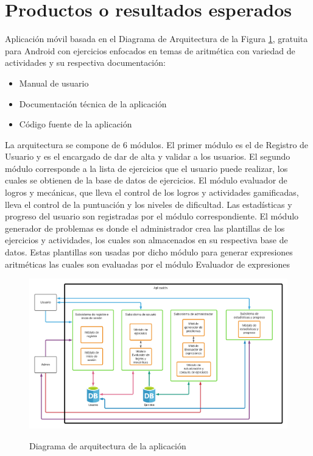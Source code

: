 \documentclass{article}
\begin{document}
\section{Productos o resultados esperados}
Aplicación móvil basada en el Diagrama de Arquitectura de la Figura \ref{fig:arquitectura}, 
gratuita para Android con ejercicios enfocados en temas de aritmética con variedad de 
actividades y su respectiva documentación:
\begin{itemize}
	\item Manual de usuario
	\item Documentación técnica de la aplicación
	\item Código fuente de la aplicación
\end{itemize}
La arquitectura se compone de 6 módulos.  El primer módulo es el de Registro de Usuario y es el encargado de dar de alta y validar a los usuarios. El segundo módulo corresponde a la lista de ejercicios que el usuario puede realizar, los cuales se obtienen de la base de datos de ejercicios. El módulo evaluador de logros y mecánicas, que lleva el control de los logros y actividades gamificadas, lleva el control de la puntuación y los niveles de dificultad. Las estadísticas y progreso del usuario son registradas por el módulo correspondiente. El módulo generador de problemas es donde el administrador crea las plantillas de los ejercicios y actividades, los cuales son almacenados en su respectiva base de datos. Estas plantillas son usadas por dicho módulo para generar expresiones aritméticas las cuales son evaluadas por el módulo Evaluador de expresiones    
\begin{figure}[H]
\centering
\includegraphics[width=1\textwidth]{img/Diagrama_arqui.png}\\
\caption{Diagrama de arquitectura de la aplicación}
\label{fig:arquitectura}
\end{figure}
\end{document}
